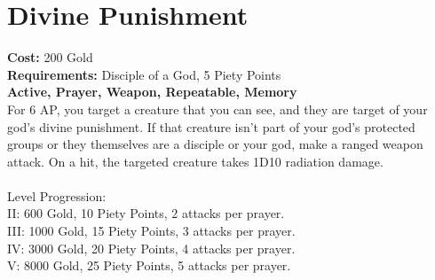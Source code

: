 \section*{Divine Punishment}
\textbf{Cost:} 200 Gold\\
\textbf{Requirements:} Disciple of a God, 5 Piety Points \\
\textbf{Active, Prayer, Weapon, Repeatable, Memory}\\
For 6 AP, you target a creature that you can see, and they are target of your god's divine punishment. If that creature isn't part of your god's protected groups or they themselves are a disciple or your god, make a ranged weapon attack. On a hit, the targeted creature takes 1D10 radiation damage.\\
\\
Level Progression:\\
II: 600 Gold, 10 Piety Points, 2 attacks per prayer.\\
III: 1000 Gold, 15 Piety Points, 3 attacks per prayer.\\
IV: 3000 Gold, 20 Piety Points, 4 attacks per prayer.\\
V: 8000 Gold, 25 Piety Points, 5 attacks per prayer.\\